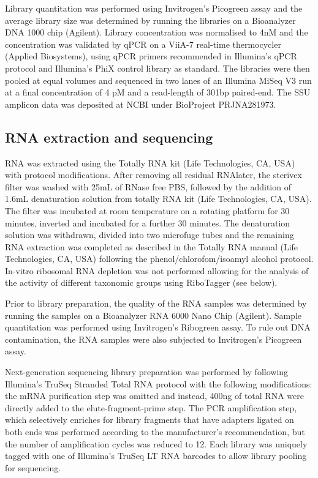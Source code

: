 Library quantitation was performed using Invitrogen's Picogreen assay and the average library size was determined by running the libraries on a Bioanalyzer DNA 1000 chip (Agilent). Library concentration was normalised to 4nM and the concentration was validated by qPCR on a ViiA-7 real-time thermocycler (Applied Biosystems), using qPCR primers recommended in Illumina's qPCR protocol and Illumina's PhiX control library as standard. The libraries were then pooled at equal volumes and sequenced in two lanes of an Illumina MiSeq V3 run at a final concentration of 4 pM and a read-length of 301bp paired-end. The SSU amplicon data was deposited at NCBI under BioProject PRJNA281973.

\subsection{RNA extraction and sequencing}

RNA was extracted using the Totally RNA kit (Life Technologies, CA, USA) with protocol modifications. After removing all residual RNAlater, the sterivex filter was washed with 25mL of RNase free PBS, followed by the addition of 1.6mL denaturation solution from totally RNA kit (Life Technologies, CA, USA). The filter was incubated at room temperature on a rotating platform for 30 minutes, inverted and incubated for a further 30 minutes. The denaturation solution was withdrawn, divided into two microfuge tubes and the remaining RNA extraction was completed as described in the Totally RNA manual (Life Technologies, CA, USA) following the phenol/chlorofom/isoamyl alcohol protocol. In-vitro ribosomal RNA depletion was not performed allowing for the analysis of the activity of different taxonomic groups using RiboTagger (see below).

Prior to library preparation, the quality of the RNA samples was determined by running the samples on a Bioanalyzer RNA 6000 Nano Chip (Agilent). Sample quantitation was performed using Invitrogen's Ribogreen assay. To rule out DNA contamination, the RNA samples were also subjected to Invitrogen's Picogreen assay.

Next-generation sequencing library preparation was performed by following Illumina's TruSeq Stranded Total RNA protocol with the following modifications: the mRNA purification step was omitted and instead, 400ng of total RNA were directly added to the elute-fragment-prime step. The PCR amplification step, which selectively enriches for library fragments that have adapters ligated on both ends was performed according to the manufacturer's recommendation, but the number of amplification cycles was reduced to 12. Each library was uniquely tagged with one of Illumina's TruSeq LT RNA barcodes to allow library pooling for sequencing.

